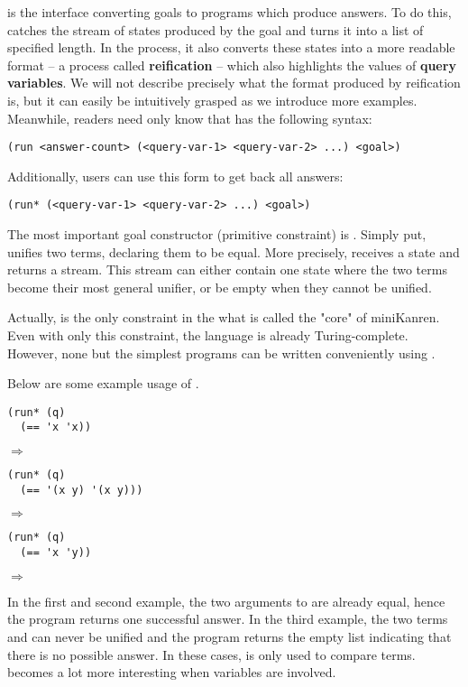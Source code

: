  is the interface converting goals to programs which produce answers. To do this,  catches the stream of states produced by the goal and turns it into a list of specified length. In the process, it also converts these states into a more readable format -- a process called \textbf{reification} -- which also highlights the values of \textbf{query variables}. We will not describe precisely what the format produced by reification is, but it can easily be intuitively grasped as we introduce more examples. Meanwhile, readers need only know that  has the following syntax:
\lstset{language=Scheme, showstringspaces=false, breaklines=true}
\begin{lstlisting}
(run <answer-count> (<query-var-1> <query-var-2> ...) <goal>)
\end{lstlisting}

Additionally, users can use this form to get back all answers:
\begin{lstlisting}
(run* (<query-var-1> <query-var-2> ...) <goal>)
\end{lstlisting}

The most important goal constructor (primitive constraint) is \code{==}.
Simply put, \code{==} unifies two terms, declaring them to be equal. More precisely, \code{==} receives a state and returns a stream. This stream can either contain one state where the two terms become their most general unifier, or be empty when they cannot be unified.

Actually, \code{==} is the only constraint in the what is called the "core" of miniKanren. Even with only this constraint, the language is already Turing-complete. However, none but the simplest programs can be written conveniently using \code{==}.

Below are some example usage of \code{==}.
\begin{lstlisting}
(run* (q)
  (== 'x 'x))
\end{lstlisting}
$\Rightarrow$ 

\begin{lstlisting}
(run* (q)
  (== '(x y) '(x y)))
\end{lstlisting}
$\Rightarrow$ 

\begin{lstlisting}
(run* (q)
  (== 'x 'y))
\end{lstlisting}
$\Rightarrow$ \code{()}

In the first and second example, the two arguments to \code{==} are already equal, hence the program returns one successful answer. In the third example, the two terms  and  can never be unified and the program returns the empty list indicating that there is no possible answer. In these cases, \code{==} is only used to compare terms. \code{==} becomes a lot more interesting when variables are involved.

